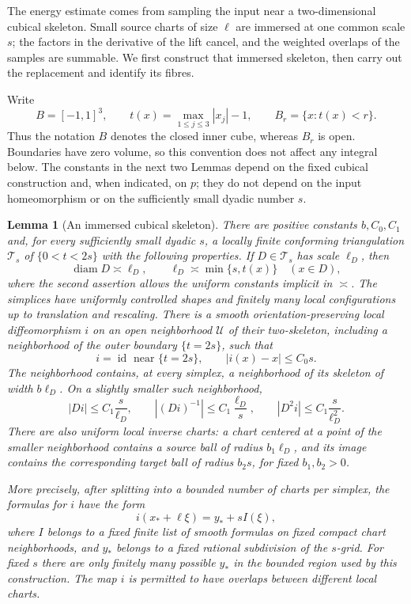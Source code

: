 \documentclass[11pt]{article}
\numberwithin{equation}{section}
\newtheorem{lemma}[theorem]{Lemma}
\theoremstyle{definition}
\theoremstyle{remark}
\begin{document}
The energy estimate comes from sampling the input near a
two-dimensional cubical skeleton.  Small source charts of size $\ell$
are immersed at one common scale $s$; the factors in the derivative of
the lift cancel, and the weighted overlaps of the samples are summable.
We first construct that immersed skeleton, then carry out the
replacement and identify its fibres.

Write
\[
 B=[-1,1]^3,\qquad t(x)=\max_{1\leq j\leq3}|x_j|-1,
 \qquad B_r=\{x:t(x)<r\}.
\]
Thus the notation $B$ denotes the closed inner cube, whereas $B_r$ is
open.  Boundaries have zero volume, so this convention does not affect
any integral below.  The constants in the next two Lemmas depend on the fixed cubical
construction and, when indicated, on $p$; they do not depend on the input
homeomorphism or on the sufficiently small dyadic number $s$.

\begin{lemma}[An immersed cubical skeleton]\label{hp:immersed-skeleton}
There are positive constants $b,C_0,C_1$ and, for every sufficiently small
dyadic $s$, a locally finite conforming triangulation $\mathcal T_s$ of
$\{0<t<2s\}$ with the following properties.  If $D\in\mathcal T_s$ has
scale $\ell_D$, then
\[
 \operatorname{diam} D\asymp\ell_D,
 \qquad \ell_D\asymp\min\{s,t(x)\}\quad(x\in D),
\]
where the second assertion allows the uniform constants implicit in
$\asymp$.  The simplices have uniformly controlled shapes and finitely
many local configurations up to translation and rescaling.  There is a
smooth orientation-preserving local diffeomorphism $i$ on an open
neighborhood $\mathcal U$ of their two-skeleton, including a neighborhood
of the outer boundary $\{t=2s\}$, such that
\[
 i=\operatorname{id}\text{ near }\{t=2s\},\qquad
 |i(x)-x|\leq C_0s.
\]
The neighborhood contains, at every simplex, a neighborhood of its
skeleton of width $b\ell_D$.  On a slightly smaller such neighborhood,
\begin{equation}\label{hp:immersion-bounds}
 |Di|\leq C_1\frac{s}{\ell_D},\qquad
 |(Di)^{-1}|\leq C_1\frac{\ell_D}{s},\qquad
 |D^2i|\leq C_1\frac{s}{\ell_D^2}.
\end{equation}
There are also uniform local inverse charts: a chart centered at a
point of the smaller neighborhood contains a source ball of radius
$b_1\ell_D$, and its image contains the corresponding target ball of
radius $b_2s$, for fixed $b_1,b_2>0$.

More precisely, after splitting into a bounded number of charts per
simplex, the formulas for $i$ have the form
\begin{equation}\label{hp:immersion-template}
 i(x_*+\ell\xi)=y_*+sI(\xi),
\end{equation}
where $I$ belongs to a fixed finite list of smooth formulas on fixed
compact chart neighborhoods, and $y_*$ belongs to a fixed rational
subdivision of the $s$-grid.  For fixed $s$ there are only finitely many
possible $y_*$ in the bounded region used by this construction.  The
map $i$ is permitted to have overlaps between different local charts.
\end{lemma}
\end{document}
